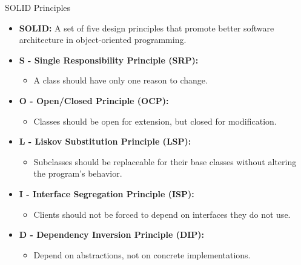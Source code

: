 \documentclass[10pt]{beamer}
\begin{document}
\begin{frame}{SOLID Principles}
  \begin{itemize}
      \item \textbf{SOLID:} A set of five design principles that promote better software architecture in object-oriented programming.
      
      \item \textbf{S - Single Responsibility Principle (SRP):}
      \begin{itemize}
          \item A class should have only one reason to change.
      \end{itemize}

      \item \textbf{O - Open/Closed Principle (OCP):}
      \begin{itemize}
          \item Classes should be open for extension, but closed for modification.
      \end{itemize}

      \item \textbf{L - Liskov Substitution Principle (LSP):}
      \begin{itemize}
          \item Subclasses should be replaceable for their base classes without altering the program's behavior.
      \end{itemize}

      \item \textbf{I - Interface Segregation Principle (ISP):}
      \begin{itemize}
          \item Clients should not be forced to depend on interfaces they do not use.
      \end{itemize}

      \item \textbf{D - Dependency Inversion Principle (DIP):}
      \begin{itemize}
          \item Depend on abstractions, not on concrete implementations.
      \end{itemize}
  \end{itemize}
\end{frame}
\end{document}
